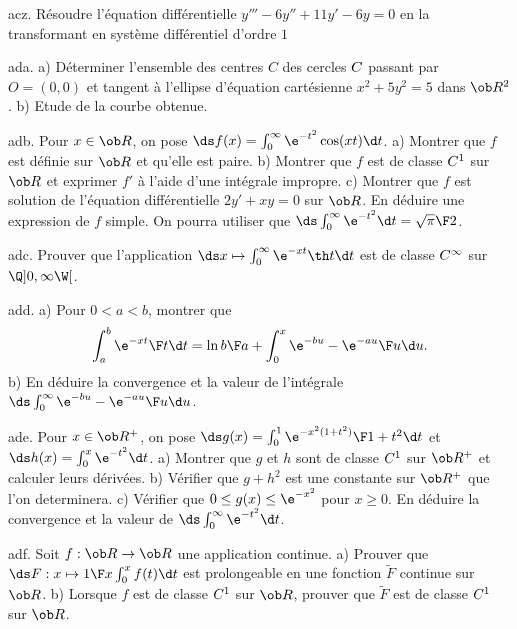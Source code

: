 \exo [Level=2,Fight=1,Learn=1,Field=\SystèmesDifférentiels,Type=\Exercices,Origin=] acz. 
Résoudre l'équation différentielle $y'''-6y''+11y'-6y=0$ 
en la transformant en système différentiel d'ordre $1$

\exo [Level=2,Fight=2,Learn=1,Field=\RepèreDeFrenet,Type=\Exercices,Origin=] ada. 
a) Déterminer l'ensemble des centres $C$ des cercles $\sc C$ passant par $O=(0,0)$ et tangent à l'ellipse 
d'équation cartésienne $x^2+5y^2=5$ dans $\ob R^2$. \pn
b) Etude de la courbe obtenue. 

\exo [Level=2,Fight=2,Learn=2,Field=\FonctionsDéfiniesParUneIntégrale,Type=\Exercices,Origin=] adb. 
Pour $x\in\ob R$, on pose $\ds f(x)=\int_0^\infty\e^{-t^2}\cos(xt)\d t$. \pn
a) Montrer que $f$ est définie sur $\ob R$ et qu'elle est paire. \pn
b) Montrer que $f$ est de classe $\sc C^1$ sur $\ob R$ et exprimer $f'$ à l'aide d'une intégrale impropre. \pn
c) Montrer que $f$ est solution de l'équation différentielle $2y'+xy=0$ sur $\ob R$. \pn
En déduire une expression de $f$ simple. On pourra utiliser que $\ds\int_0^\infty\e^{-t^2}\d t={\sqrt\pi\F2}$. 

\exo [Level=2,Fight=1,Learn=1,Field=\FonctionsDéfiniesParUneIntégrale,Type=\Exercices,Origin=] adc. 
Prouver que l'application $\ds x\mapsto\int_0^\infty\e^{-xt}\th t\d t$ est de classe $\sc C^\infty$ sur $\Q]0,\infty\W[$. 

\exo [Level=2,Fight=2,Learn=2,Field=\FonctionsDéfiniesParUneIntégrale,Type=\Exercices,Origin=] add. 
a) Pour $0<a<b$, montrer que 
$$
\int_a^b{\e^{-xt}\F t}\d t=\ln{b\F a}+\int_0^x{\e^{-bu}-\e^{-au}\F u}\d u.
$$
b) En déduire la convergence et la valeur de l'intégrale $\ds\int_0^\infty{\e^{-bu}-\e^{-au}\F u}\d u$. 

\exo [Level=2,Fight=1,Learn=1,Field=\FonctionsDéfiniesParUneIntégrale,Type=\Exercices,Origin=] ade. 
Pour $x\in\ob R^+$, on pose $\ds g(x)=\int_0^1{\e^{-x^2(1+t^2)}\F1+t^2}\d t$ et $\ds h(x)=\int_0^x\e^{-t^2}\d t$. \pn
a) Montrer que $g$ et $h$ sont de classe $\sc C^1$ sur $\ob R^+$ et calculer leurs dérivées. \pn
b) Vérifier que $g+h^2$ est une constante sur $\ob R^+$ que l'on determinera. \pn
c) Vérifier que $0\le g(x)\le \e^{-x^2}$ pour $x\ge0$. En déduire la convergence et la valeur de $\ds\int_0^\infty\e^{-t^2}\d t$. 

\exo [Level=2,Fight=1,Learn=1,Field=\FonctionsDéfiniesParUneIntégrale,Type=\Exercices,Origin=] adf. 
Soit $f:\ob R\to\ob R$ une application continue.  \pn
a) Prouver que $\ds F:x\mapsto {1\F x}\int_0^xf(t)\d t$ est prolongeable 
en une fonction $\tilde F$ continue sur  $\ob R$. \pn
b) Lorsque $f$ est de classe $\sc C^1$ sur $\ob R$, prouver que $\tilde F$ est de classe $\sc C^1$ sur $\ob R$. 

